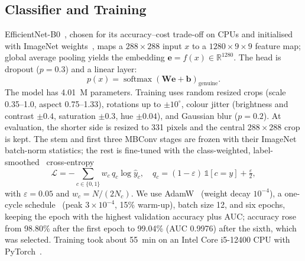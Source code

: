 \documentclass[journal]{IEEEtran}
\begin{document}
\subsection{Classifier and Training}
\label{sec:training}
EfficientNet-B0~\cite{tan2019efficientnet}, chosen for its accuracy--cost trade-off on
CPUs and initialised with ImageNet weights~\cite{deng2009imagenet}, maps a $288\times288$ input $x$ to a
$1280\times9\times9$ feature map; global average pooling yields the embedding
$\mathbf{e}=f(x)\in\mathbb{R}^{1280}$. The head is dropout ($p=0.3$) and a linear layer:
\begin{equation}
p(x) = \operatorname{softmax}\!\left(\mathbf{W}\mathbf{e}+\mathbf{b}\right)_{\text{genuine}} .
\label{eq:prob}
\end{equation}
The model has 4.01~M parameters. Training uses random resized crops (scale 0.35--1.0,
aspect 0.75--1.33), rotations up to $\pm10^\circ$, colour jitter (brightness and contrast
$\pm0.4$, saturation $\pm0.3$, hue $\pm0.04$), and Gaussian blur ($p=0.2$). At
evaluation, the shorter side is resized to 331 pixels and the central $288\times288$
crop is kept. The stem and first three MBConv stages are frozen with their ImageNet
batch-norm statistics; the rest is fine-tuned with the class-weighted,
label-smoothed~\cite{szegedy2016inception} cross-entropy
\begin{equation}
\mathcal{L} = -\sum_{c\in\{0,1\}} w_c\, q_c \log \hat{y}_c, \quad
q_c = (1-\varepsilon)\,\mathbb{1}[c=y] + \tfrac{\varepsilon}{2},
\label{eq:loss}
\end{equation}
with $\varepsilon=0.05$ and $w_c=N/(2N_c)$. We use AdamW~\cite{loshchilov2019adamw}
(weight decay $10^{-4}$), a one-cycle schedule~\cite{smith2019superconvergence} (peak
$3\times10^{-4}$, 15\% warm-up), batch size 12, and six epochs, keeping the epoch with
the highest validation accuracy plus AUC; accuracy rose from 98.80\% after the first
epoch to 99.04\% (AUC 0.9976) after the sixth, which was selected. Training took
about 55~min on an Intel Core i5-12400 CPU with PyTorch~\cite{paszke2019pytorch}.
\end{document}
